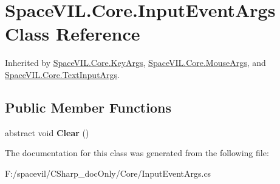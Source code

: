 \hypertarget{class_space_v_i_l_1_1_core_1_1_input_event_args}{}\section{Space\+V\+I\+L.\+Core.\+Input\+Event\+Args Class Reference}
\label{class_space_v_i_l_1_1_core_1_1_input_event_args}


Inherited by \mbox{\hyperlink{class_space_v_i_l_1_1_core_1_1_key_args}{Space\+V\+I\+L.\+Core.\+Key\+Args}}, \mbox{\hyperlink{class_space_v_i_l_1_1_core_1_1_mouse_args}{Space\+V\+I\+L.\+Core.\+Mouse\+Args}}, and \mbox{\hyperlink{class_space_v_i_l_1_1_core_1_1_text_input_args}{Space\+V\+I\+L.\+Core.\+Text\+Input\+Args}}.

\subsection*{Public Member Functions}
\begin{DoxyCompactItemize}
\item 
\mbox{\label{class_space_v_i_l_1_1_core_1_1_input_event_args_ac8e757e62418b3d0ae057b93e3cae76c}} 
abstract void {\bfseries Clear} ()
\end{DoxyCompactItemize}


The documentation for this class was generated from the following file\+:\begin{DoxyCompactItemize}
\item 
F\+:/spacevil/\+C\+Sharp\+\_\+doc\+Only/\+Core/Input\+Event\+Args.\+cs\end{DoxyCompactItemize}

